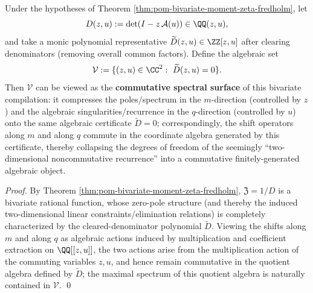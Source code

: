 \begin{theorem}\label{thm:pom-commutative-spectral-surface}
Under the hypotheses of Theorem \ref{thm:pom-bivariate-moment-zeta-fredholm}, let
\[
D(z,u):=\det(I-z\,\mathcal{A}(u))\in\QQ(z,u),
\]
and take a monic polynomial representative \(\widetilde D(z,u)\in\ZZ[z,u]\) after clearing denominators (removing overall common factors).
Define the algebraic set
\[
\mathcal{V}:=\{(z,u)\in\CC^{2}:\ \widetilde D(z,u)=0\}.
\]
Then \(\mathcal{V}\) can be viewed as the \textbf{commutative spectral surface} of this bivariate compilation: it compresses the poles/spectrum in the \(m\)-direction (controlled by \(z\)) and the algebraic singularities/recurrence in the \(q\)-direction (controlled by \(u\)) onto the same algebraic certificate \(\widetilde D=0\);
correspondingly, the shift operators along \(m\) and along \(q\) commute in the coordinate algebra generated by this certificate, thereby collapsing the degrees of freedom of the seemingly ``two-dimensional noncommutative recurrence'' into a commutative finitely-generated algebraic object.
\end{theorem}
\begin{proof}
By Theorem \ref{thm:pom-bivariate-moment-zeta-fredholm}, \(\mathfrak{Z}=1/D\) is a bivariate rational function, whose zero-pole structure (and thereby the induced two-dimensional linear constraints/elimination relations) is completely characterized by the cleared-denominator polynomial \(\widetilde D\).
Viewing the shifts along \(m\) and along \(q\) as algebraic actions induced by multiplication and coefficient extraction on \(\QQ[[z,u]]\), the two actions arise from the multiplication action of the commuting variables \(z,u\), and hence remain commutative in the quotient algebra defined by \(\widetilde D\); the maximal spectrum of this quotient algebra is naturally contained in \(\mathcal{V}\).
\qed
\end{proof}



